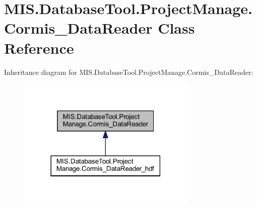 \hypertarget{classMIS_1_1DatabaseTool_1_1ProjectManage_1_1Cormis__DataReader}{}\section{M\+I\+S.\+Database\+Tool.\+Project\+Manage.\+Cormis\+\_\+\+Data\+Reader Class Reference}
\label{classMIS_1_1DatabaseTool_1_1ProjectManage_1_1Cormis__DataReader}


Inheritance diagram for M\+I\+S.\+Database\+Tool.\+Project\+Manage.\+Cormis\+\_\+\+Data\+Reader\+:\nopagebreak
\begin{figure}[H]
\begin{center}
\leavevmode
\includegraphics[width=242pt]{classMIS_1_1DatabaseTool_1_1ProjectManage_1_1Cormis__DataReader__inherit__graph}
\end{center}
\end{figure}
